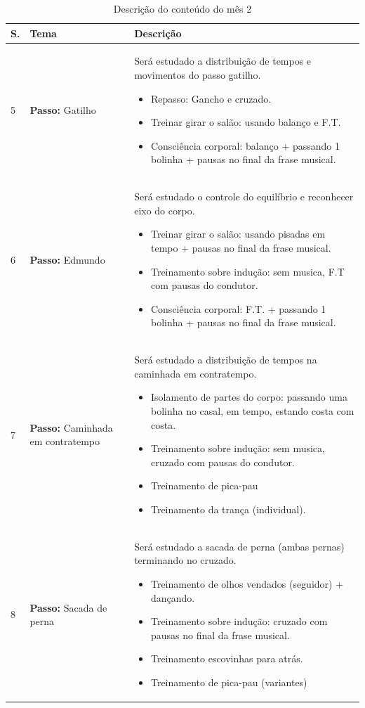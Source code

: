 \documentclass[12pt, a4paper]{article}
\begin{document}
\begin{table}[h]
\centering
\begin{tabular}{|p{0.5cm}|p{3.0cm}|p{12.0cm}|}
\hline
S. & Tema & Descrição \\  \hline \hline            
5 &  \textbf{Passo:} Gatilho &  Será estudado a distribuição de tempos e movimentos do passo gatilho.
        \begin{itemize}
        \item Repasso: Gancho e cruzado.
        \item Treinar girar o salão: usando balanço e F.T.
        \item Consciência corporal: balanço + passando 1 bolinha + pausas no final da frase musical.
        \end{itemize}
        \\ \hline 
6 &  \textbf{Passo:} Edmundo &  Será estudado o controle do equilíbrio e reconhecer eixo do corpo. 
        \begin{itemize}
        \item Treinar girar o salão: usando pisadas em tempo + pausas no final da frase musical.
        \item Treinamento sobre indução: sem musica, F.T com pausas do condutor.
        \item Consciência corporal: F.T. + passando 1 bolinha + pausas no final da frase musical.
        \end{itemize}
        \\ \hline 
7 &  \textbf{Passo:} Caminhada em contratempo & Será estudado a distribuição de tempos na caminhada em contratempo. 
        \begin{itemize}
        \item Isolamento de partes do corpo: passando uma bolinha no casal, em tempo, estando costa com costa.
        \item Treinamento sobre indução: sem musica, cruzado com pausas do condutor.
        \item Treinamento de pica-pau
        \item Treinamento da trança (individual).
        \end{itemize}
        \\ \hline 
8 &  \textbf{Passo:} Sacada de perna & Será estudado a sacada de perna (ambas pernas) terminando no cruzado. 
        \begin{itemize}
        \item Treinamento de olhos vendados (seguidor) + dançando.
        \item Treinamento sobre indução: cruzado com pausas no final da frase musical.
        \item Treinamento escovinhas para atrás.
        \item Treinamento de pica-pau (variantes)
        \end{itemize}
        \\ \hline 
\end{tabular}
\caption{Descrição do conteúdo do mês 2}
\label{tab:myfirsttable2}
\end{table}
\end{document}
